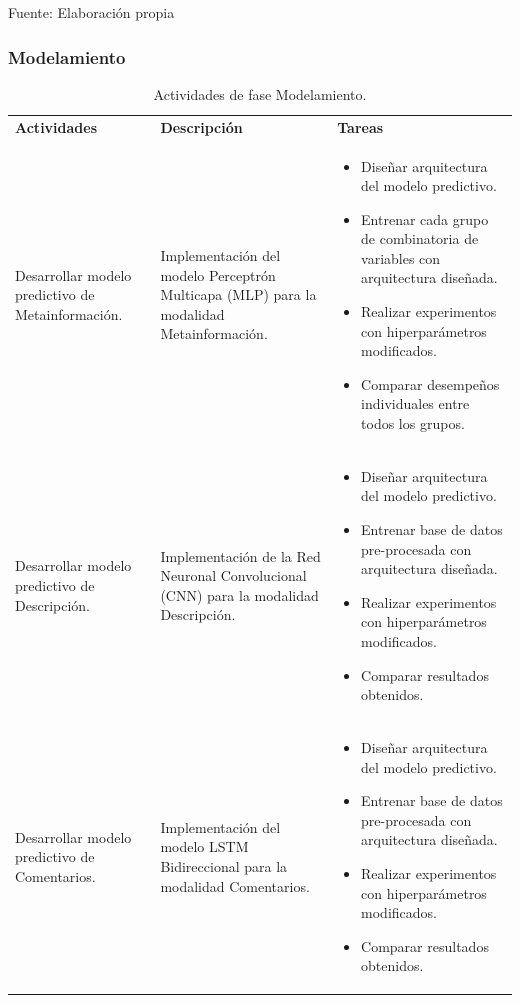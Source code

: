 \begin{flushleft}	%
	\small Fuente: Elaboración propia
\end{flushleft}

\subsubsection{Modelamiento}



\begin{longtable}{|M{5cm}|M{5cm}|M{5cm}|}
	\caption[Actividades de fase Modelamiento]{Actividades de fase Modelamiento.}
	\label{3:table6}
	\newcommand{\multirot}[1]{\multirow{2}{*}[-8ex]{\rotcell{\rlap{#1}}}}
	\footnotesize
	\centering
	\small
	\tabularnewline\hline
	\textbf{Actividades} & \textbf{Descripción} & \textbf{Tareas}
	\\
	\hline
	Desarrollar modelo predictivo de Metainformación.
	& Implementación del modelo Perceptrón Multicapa (MLP) para la modalidad Metainformación.
	& 
	\begin{itemize}[noitemsep,leftmargin=*]
		\item Diseñar arquitectura del modelo predictivo.
		\item Entrenar cada grupo de combinatoria de variables con arquitectura diseñada.
		\item Realizar experimentos con hiperparámetros modificados.
		\item Comparar desempeños individuales entre todos los grupos.
	\end{itemize}
	\\
	\hline
	Desarrollar modelo predictivo de Descripción.
	& Implementación de la Red Neuronal Convolucional (CNN) para la modalidad Descripción.
	& 
	\begin{itemize}[noitemsep,leftmargin=*]
		\item Diseñar arquitectura del modelo predictivo.
		\item Entrenar base de datos pre-procesada con arquitectura diseñada.
		\item Realizar experimentos con hiperparámetros modificados.
		\item Comparar resultados obtenidos.
	\end{itemize}
	\\
	\hline
	Desarrollar modelo predictivo de Comentarios.
	& Implementación del modelo LSTM Bidireccional para la modalidad Comentarios.
	& 
	\begin{itemize}[noitemsep,leftmargin=*]
		\item Diseñar arquitectura del modelo predictivo.
		\item Entrenar base de datos pre-procesada con arquitectura diseñada.
		\item Realizar experimentos con hiperparámetros modificados.
		\item Comparar resultados obtenidos.
	\end{itemize}
	\\
	\hline
\end{longtable}%
